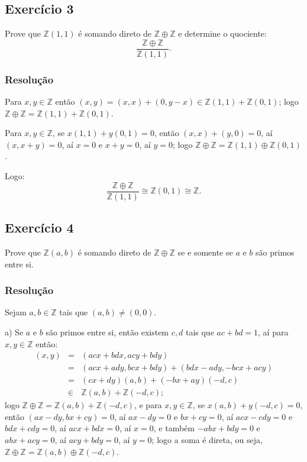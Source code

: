 \documentclass[10pt,a4paper]{article}
\begin{document}
\subsection*{Exercício 3}

Prove que $\mathbb{Z}(1,1)$ é somando direto de $\mathbb{Z}\oplus\mathbb{Z}$ e determine o quociente:
\[
\frac{\mathbb{Z}\oplus\mathbb{Z}}{\mathbb{Z}(1,1)}.
\]

\subsubsection*{Resolução}

Para $x,y\in\mathbb{Z}$ então $(x,y)=(x,x)+(0,y-x)\in\mathbb{Z}(1,1)+\mathbb{Z}(0,1)$; logo $\mathbb{Z}\oplus\mathbb{Z}=\mathbb{Z}(1,1)+\mathbb{Z}(0,1)$.

\medskip
\noindent
Para $x,y\in\mathbb{Z}$, se $x(1,1)+y(0,1)=0$, então $(x,x)+(y,0)=0$, aí $(x,x+y)=0$, aí $x=0$ e $x+y=0$, aí $y=0$; logo $\mathbb{Z}\oplus\mathbb{Z}=\mathbb{Z}(1,1)\oplus\mathbb{Z}(0,1)$.

\medskip
\noindent
Logo:
\[
\frac{\mathbb{Z}\oplus\mathbb{Z}}{\mathbb{Z}(1,1)}\cong\mathbb{Z}(0,1)\cong\mathbb{Z}.
\]

\subsection*{Exercício 4}

Prove que $\mathbb{Z}(a,b)$ é somando direto de $\mathbb{Z}\oplus\mathbb{Z}$ se e somente se $a$ e $b$ são primos entre si.

\subsubsection*{Resolução}

Sejam $a,b\in\mathbb{Z}$ tais que $(a,b)\neq(0,0)$.

\medskip
\noindent
a) Se $a$ e $b$ são primos entre si, então existem $c,d$ tais que $ac+bd=1$, aí para $x,y\in\mathbb{Z}$ então:
\[
\begin{array}{rcl}
(x,y)&=&(acx+bdx,acy+bdy)\\&=&(acx+ady,bcx+bdy)+(bdx-ady,-bcx+acy)\\&=&(cx+dy)(a,b)+(-bx+ay)(-d,c)\\&\in&\mathbb{Z}(a,b)+\mathbb{Z}(-d,c);
\end{array}
\]
logo $\mathbb{Z}\oplus\mathbb{Z}=\mathbb{Z}(a,b)+\mathbb{Z}(-d,c)$, e para $x,y\in\mathbb{Z}$, se $x(a,b)+y(-d,c)=0$, então $(ax-dy,bx+cy)=0$, aí $ax-dy=0$ e $bx+cy=0$, aí $acx-cdy=0$ e $bdx+cdy=0$, aí $acx+bdx=0$, aí $x=0$, e também $-abx+bdy=0$ e $abx+acy=0$, aí $acy+bdy=0$, aí $y=0$; logo a soma é direta, ou seja, $\mathbb{Z}\oplus\mathbb{Z}=\mathbb{Z}(a,b)\oplus\mathbb{Z}(-d,c)$.
\end{document}
